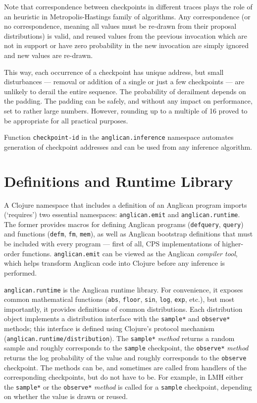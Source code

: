 \documentclass[preprint]{sigplanconf}
\begin{document}
Note that correspondence between checkpoints in different
traces plays the role of an heuristic in Metropolis-Hastings
family of algorithms. Any correspondence (or no correspondence,
meaning all values must be re-drawn from their proposal
distributions) is valid, and reused values from the previous
invocation which are not in support or have zero probability in
the new invocation are simply ignored and new values are
re-drawn.

This way, each occurrence of a checkpoint has unique address,
but small disturbances --- removal or addition of a single or just
a few checkpoints --- are unlikely to derail the entire sequence.
The probability of derailment depends on the padding. The
padding can be safely, and without any impact on performance,
set to rather large numbers. However, rounding up to a multiple
of 16 proved to be appropriate for all practical purposes.

Function \texttt{checkpoint-id} in the
\texttt{anglican.inference} namespace automates generation of
checkpoint addresses and can be used from any inference
algorithm.

\section{Definitions and Runtime Library}
\label{seq:runtime}

A Clojure namespace that includes a definition of an Anglican
program imports (`requires') two essential namespaces:
\texttt{anglican.emit} and \texttt{anglican.runtime}. The former
provides macros for defining Anglican programs
(\texttt{defquery}, \texttt{query}) and functions
(\texttt{defm}, \texttt{fm}, \texttt{mem}), as well as Anglican
bootstrap definitions that must be included with every program
--- first of all, CPS implementations of higher-order functions.
\texttt{anglican.emit} can be viewed as the Anglican
\textit{compiler tool}, which helps transform Anglican code into
Clojure before any inference is performed.

\texttt{anglican.runtime} is the Anglican runtime library. For
convenience, it exposes common mathematical functions
(\texttt{abs}, \texttt{floor}, \texttt{sin}, \texttt{log},
\texttt{exp}, etc.), but most importantly, it provides
definitions of common distributions. Each distribution object
implements a distribution interface with the \texttt{sample*} and \texttt{observe*}
methods; this interface is defined using Clojure's protocol mechanism
(\texttt{anglican.{\linebreak[0]}runtime/{\linebreak[0]}distribution}).
The \texttt{sample*} \textit{method} returns a random sample and
roughly corresponds to the \texttt{sample} checkpoint,
the \texttt{observe*} \textit{method} returns the log probability
of the value and roughly corresponds to the \texttt{observe}
checkpoint. The methods can be, and sometimes are called from
handlers of the corresponding checkpoints, but do not have to
be. For example, in LMH either the \texttt{sample*} or
the \texttt{observe*} \textit{method} is called for a
\texttt{sample} checkpoint, depending on whether the value is
drawn or reused.
\end{document}
